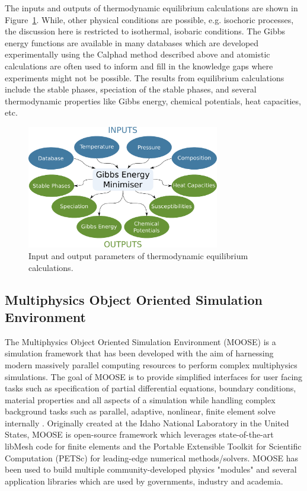 	The inputs and outputs of thermodynamic equilibrium calculations are shown in Figure~\ref{fig:Thermod}. While, other physical conditions are possible, e.g. isochoric processes, the discussion here is restricted to isothermal, isobaric conditions. The Gibbs energy functions are available in many databases which are developed experimentally using the Calphad method described above and atomistic calculations are often used to inform and fill in the knowledge gaps where experiments might not be possible. The results from equilibrium calculations include the stable phases, speciation of the stable phases, and several thermodynamic properties like Gibbs energy, chemical potentials, heat capacities, etc.
	\begin{figure}[ht]
        		\centering
        		\includegraphics[width=0.75\textwidth]{figures/chapter-1/thermodynamics.pdf}
        		\caption{Input and output parameters of thermodynamic equilibrium calculations.}
        		\label{fig:Thermod}
    	\end{figure}
	
\subsection{Multiphysics Object Oriented Simulation Environment}
	The Multiphysics Object Oriented Simulation Environment (MOOSE) is a simulation framework that has been developed with the aim of harnessing modern massively parallel computing resources to perform complex multiphysics simulations. The goal of MOOSE is to provide simplified interfaces for user facing tasks such as specification of partial differential equations, boundary conditions, material properties and all aspects of a simulation while handling complex background tasks such as parallel, adaptive, nonlinear, finite element solve internally \cite{Permann:2020aa}. Originally created at the Idaho National Laboratory in the United States, MOOSE is open-source framework which leverages state-of-the-art libMesh code \cite{Kirk:2006aa} for finite elements and the Portable Extensible Toolkit for Scientific Computation (PETSc) \cite{Balay:2022ab,Balay:2022aa} for leading-edge numerical methods/solvers. MOOSE has been used to build multiple community-developed physics "modules" \cite{Guillaume:2021aa,Guillaume:2021ab,Adhikary:2016aa,Wilkins:2020aa,Shemon:2021aa} and several application libraries which are used by governments, industry and academia. 
	
